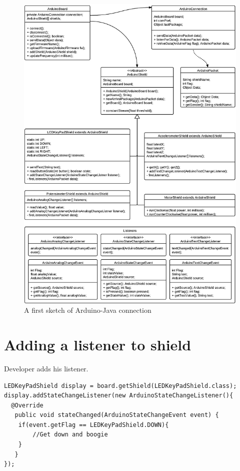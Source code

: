 \clearpage{}

\begin{figure}[hp]
\includegraphics{img/architecture-arduinojava} \caption{A first sketch of Arduino-Java connection}


\label{fig:architecture-arduinojava} 
\end{figure}



\section{Adding a listener to shield}

Developer adds his listener. \javacode  {}
\begin{lstlisting}
LEDKeyPadShield display = board.getShield(LEDKeyPadShield.class);
display.addStateChangeListener(new ArduinoStateChangeListener(){
  @Override
   public void stateChanged(ArduinoStateChangeEvent event) {
    if(event.getFlag == LEDKeyPadShield.DOWN){
        //Get down and boogie
    }
   }
});
\end{lstlisting}

